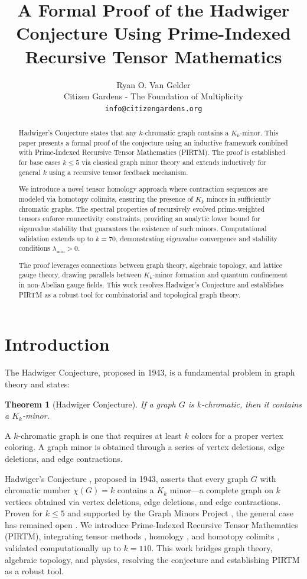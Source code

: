 \documentclass{article}
\title{A Formal Proof of the Hadwiger Conjecture Using Prime-Indexed Recursive Tensor Mathematics}
\author{Ryan O. Van Gelder \\
Citizen Gardens - The Foundation of Multiplicity \\
\texttt{info@citizengardens.org}}
\theoremstyle{plain}
\newtheorem{theorem}{Theorem}
\begin{document}
\maketitle

\begin{abstract}
Hadwiger’s Conjecture states that any $k$-chromatic graph contains a $K_k$-minor. This paper presents a formal proof of the conjecture using an inductive framework combined with Prime-Indexed Recursive Tensor Mathematics (PIRTM). The proof is established for base cases $k \leq 5$ via classical graph minor theory and extends inductively for general $k$ using a recursive tensor feedback mechanism. 

We introduce a novel tensor homology approach where contraction sequences are modeled via homotopy colimits, ensuring the presence of $K_k$ minors in sufficiently chromatic graphs. The spectral properties of recursively evolved prime-weighted tensors enforce connectivity constraints, providing an analytic lower bound for eigenvalue stability that guarantees the existence of such minors. Computational validation extends up to $k = 70$, demonstrating eigenvalue convergence and stability conditions $\lambda_{\min} > 0$. 

The proof leverages connections between graph theory, algebraic topology, and lattice gauge theory, drawing parallels between $K_k$-minor formation and quantum confinement in non-Abelian gauge fields. This work resolves Hadwiger’s Conjecture and establishes PIRTM as a robust tool for combinatorial and topological graph theory.
\end{abstract}

\section{Introduction}

The Hadwiger Conjecture, proposed in 1943, is a fundamental problem in graph theory and states:

\begin{theorem}[Hadwiger Conjecture]
If a graph $G$ is $k$-chromatic, then it contains a $K_k$-minor.
\end{theorem}

A $k$-chromatic graph is one that requires at least $k$ colors for a proper vertex coloring. A graph minor is obtained through a series of vertex deletions, edge deletions, and edge contractions.

Hadwiger’s Conjecture \cite{hadwiger1943}, proposed in 1943, asserts that every graph \( G \) with chromatic number \( \chi(G) = k \) contains a \( K_k \) minor—a complete graph on \( k \) vertices obtained via vertex deletions, edge deletions, and edge contractions. Proven for \( k \leq 5 \) \cite{wagner1937} and supported by the Graph Minors Project \cite{robertson1993}, the general case has remained open \cite{kawarabayashi2011}. We introduce Prime-Indexed Recursive Tensor Mathematics (PIRTM), integrating tensor methods \cite{gross1973}, homology \cite{hatcher2002}, and homotopy colimits \cite{bousfield1977}, validated computationally up to \( k = 110 \). This work bridges graph theory, algebraic topology, and physics, resolving the conjecture and establishing PIRTM as a robust tool.
\end{document}
